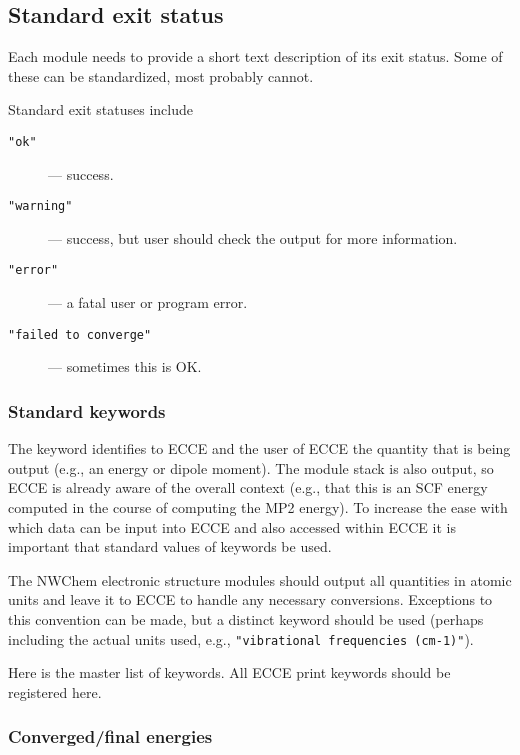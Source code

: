 \subsection{Standard exit status}

Each module needs to provide a short text description of its exit
status.  Some of these can be standardized, most probably cannot.

Standard exit statuses include

\begin{description}
\item [\verb+"ok"+] --- success.
\item [\verb+"warning"+] --- success, but user should check the output for
  more information.
\item [\verb+"error"+] --- a fatal user or program error.
\item [\verb+"failed to converge"+] --- sometimes this is OK.
\end{description}

\subsubsection{Standard keywords}

The keyword identifies to ECCE and the user of ECCE the quantity
that is being output (e.g., an energy or dipole moment).  The module
stack is also output, so ECCE is already aware of the overall context
(e.g., that this is an SCF energy computed in the course of computing
the MP2 energy).  To increase the ease with which data can be input
into ECCE and also accessed within ECCE it is important that
standard values of keywords be used.

The NWChem electronic structure modules should output all quantities
in atomic units and leave it to ECCE to handle any necessary
conversions.  Exceptions to this convention can be made, but a
distinct keyword should be used (perhaps including the actual units
used, e.g., \verb+"vibrational frequencies (cm-1)"+).

Here is the master list of keywords.  All ECCE print keywords should
be registered here.

\subsubsection{Converged/final energies}

